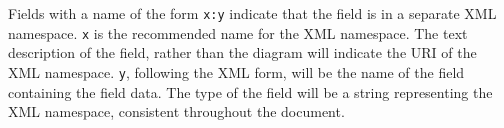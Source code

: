 \documentclass[10pt]{cekarticle}
\begin{document}
Fields with a name of the form \texttt{x:y} indicate that the
field is in a separate XML namespace.  \texttt{x} is the
recommended name for the XML namespace.  The text description of
the field, rather than the diagram will indicate the URI of the
XML namespace. \texttt{y}, following the XML form, will be the
name of the field containing the field data.  The type of the
field will be a string representing the XML namespace, consistent
throughout the document.

%
%

\clearpage





\end{document}

